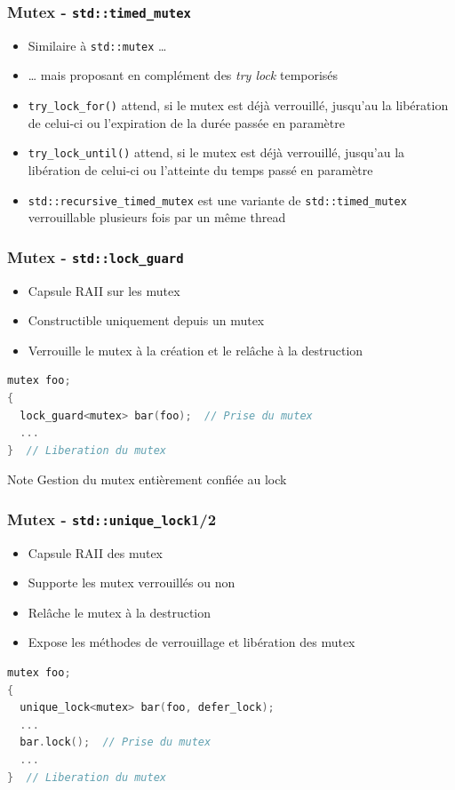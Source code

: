 \documentclass[C++.tex]{subfiles}
\begin{document}
\begin{frame}[fragile]
	\frametitle{Mutex - \lstinline|std::timed_mutex|}
	\begin{itemize}
		\item Similaire à \lstinline|std::mutex| \ldots
		\item \ldots{} mais proposant en complément des \textit{try lock} temporisés
		\item \lstinline|try_lock_for()| attend, si le mutex est déjà verrouillé, jusqu'au la libération de celui-ci ou l'expiration de la durée passée en paramètre
		\item \lstinline|try_lock_until()| attend, si le mutex est déjà verrouillé, jusqu'au la libération de celui-ci ou l'atteinte du temps passé en paramètre
		\item \lstinline|std::recursive_timed_mutex| est une variante de \lstinline|std::timed_mutex| verrouillable plusieurs fois par un même thread
	\end{itemize}
\end{frame}

\begin{frame}[fragile]
	\frametitle{Mutex - \lstinline|std::lock_guard|}
	\begin{itemize}
		\item Capsule RAII sur les mutex
		\item Constructible uniquement depuis un mutex
		\item Verrouille le mutex à la création et le relâche à la destruction
	\end{itemize}

	\begin{lstlisting}[language=C++]
mutex foo;
{
  lock_guard<mutex> bar(foo);  // Prise du mutex
  ...
}  // Liberation du mutex\end{lstlisting}

	\begin{block}{Note}
		Gestion du mutex entièrement confiée au lock
	\end{block}
\end{frame}

\begin{frame}[fragile]
	\frametitle{Mutex - \lstinline|std::unique_lock|\titlehfill{}1/2}
	\begin{itemize}
		\item Capsule RAII des mutex
		\item Supporte les mutex verrouillés ou non
		\item Relâche le mutex à la destruction
		\item Expose les méthodes de verrouillage et libération des mutex
	\end{itemize}

	\begin{lstlisting}[language=C++]
mutex foo;
{
  unique_lock<mutex> bar(foo, defer_lock);
  ...
  bar.lock();  // Prise du mutex
  ...
}  // Liberation du mutex\end{lstlisting}
\end{frame}
\end{document}
